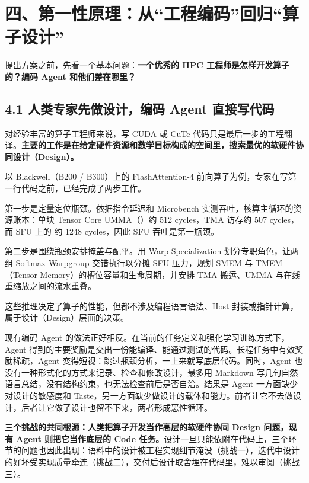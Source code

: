 \section{四、第一性原理：从“工程编码”回归“算子设计”}
提出方案之前，先看一个基本问题：\textbf{一个优秀的 HPC 工程师是怎样开发算子的？编码 Agent 和他们差在哪里？}


\subsection{4.1 人类专家先做设计，编码 Agent 直接写代码}
对经验丰富的算子工程师来说，写 CUDA 或 CuTe 代码只是最后一步的工程翻译。\textbf{主要的工作是在给定硬件资源和数学目标构成的空间里，搜索最优的软硬件协同设计（Design）。}


以 Blackwell（B200 / B300）上的 FlashAttention-4 前向算子为例，专家在写第一行代码之前，已经完成了两步工作。


第一步是定量定位瓶颈。依据指令延迟和 Microbench 实测吞吐，核算主循环的资源账本：单块 Tensor Core UMMA（）约 512 cycles，TMA 访存约 507 cycles，而 SFU 上的  约 1248 cycles，因此 SFU 吞吐是第一瓶颈。


第二步是围绕瓶颈安排掩盖与配平。用 Warp-Specialization 划分专职角色，让两组 Softmax Warpgroup 交错执行以分摊 SFU 压力，规划 SMEM 与 TMEM（Tensor Memory）的槽位容量和生命周期，并安排 TMA 搬运、UMMA 与在线重缩放之间的流水重叠。


这些推理决定了算子的性能，但都不涉及编程语言语法、Host 封装或指针计算，属于设计（Design）层面的决策。


\begin{DiagramBlock}
\end{DiagramBlock}
现有编码 Agent 的做法正好相反。在当前的任务定义和强化学习训练方式下，Agent 得到的主要奖励是交出一份能编译、能通过测试的代码。长程任务中有效奖励稀疏，Agent 变得短视：跳过瓶颈分析，一上来就写底层代码。同时，Agent 也没有一种形式化的方式来记录、检查和修改设计，最多用 Markdown 写几句自然语言总结，没有结构约束，也无法检查前后是否自洽。结果是 Agent 一方面缺少对设计的敏感度和 Taste，另一方面缺少做设计的载体和能力。前者让它不去做设计，后者让它做了设计也留不下来，两者形成恶性循环。


\textbf{三个挑战的共同根源：人类把算子开发当作高层的软硬件协同 Design 问题，现有 Agent 则把它当作底层的 Code 任务。}设计一旦只能依附在代码上，三个环节的问题也因此出现：语料中的设计被工程实现细节淹没（挑战一），迭代中设计的好坏受实现质量牵连（挑战二），交付后设计取舍埋在代码里，难以审阅（挑战三）。


